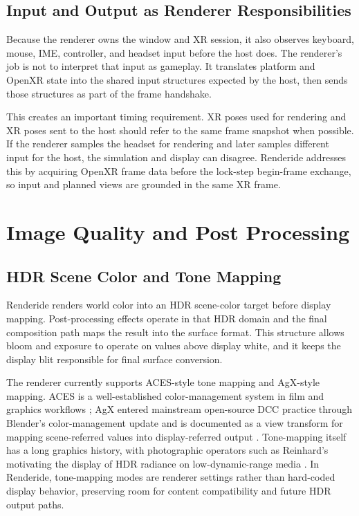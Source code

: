 \documentclass[acmtog,screen,nonacm]{acmart}
\begin{document}
\subsection{Input and Output as Renderer Responsibilities}

Because the renderer owns the window and XR session, it also observes keyboard, mouse, IME, controller, and headset input before the host does. The renderer's job is not to interpret that input as gameplay. It translates platform and OpenXR state into the shared input structures expected by the host, then sends those structures as part of the frame handshake.

This creates an important timing requirement. XR poses used for rendering and XR poses sent to the host should refer to the same frame snapshot when possible. If the renderer samples the headset for rendering and later samples different input for the host, the simulation and display can disagree. Renderide addresses this by acquiring OpenXR frame data before the lock-step begin-frame exchange, so input and planned views are grounded in the same XR frame.

\section{Image Quality and Post Processing}

\subsection{HDR Scene Color and Tone Mapping}

Renderide renders world color into an HDR scene-color target before display mapping. Post-processing effects operate in that HDR domain and the final composition path maps the result into the surface format. This structure allows bloom and exposure to operate on values above display white, and it keeps the display blit responsible for final surface conversion.

The renderer currently supports ACES-style tone mapping and AgX-style mapping. ACES is a well-established color-management system in film and graphics workflows \citep{acesOverview}; AgX entered mainstream open-source DCC practice through Blender's color-management update and is documented as a view transform for mapping scene-referred values into display-referred output \citep{blenderAgx,blenderColorManagement}. Tone-mapping itself has a long graphics history, with photographic operators such as Reinhard's motivating the display of HDR radiance on low-dynamic-range media \citep{reinhard2002tone}. In Renderide, tone-mapping modes are renderer settings rather than hard-coded display behavior, preserving room for content compatibility and future HDR output paths.
\end{document}
